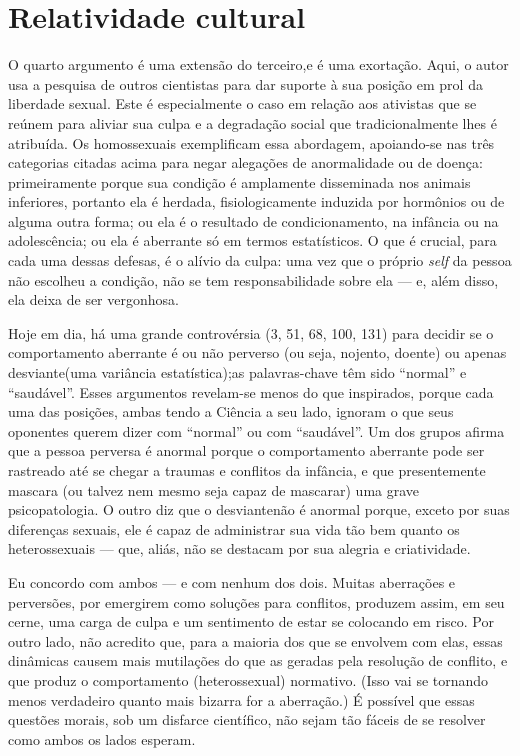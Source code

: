 \section{Relatividade cultural}

O quarto argumento é uma extensão do terceiro,\idxrela[|(] e é uma exortação.
Aqui, o autor usa a pesquisa de outros cientistas para dar suporte à
sua posição em prol da liberdade sexual. Este é especialmente o caso em
relação aos ativistas que se reúnem para aliviar sua culpa\idxculpa{} e a
degradação social que tradicionalmente lhes é atribuída. Os
homossexuais\idxhomosargu{} exemplificam essa abordagem, apoiando-se nas três
categorias citadas acima para negar alegações de anormalidade ou de
doença: primeiramente porque sua condição é amplamente disseminada nos
animais inferiores, portanto ela é herdada, fisiologicamente induzida
por hormônios ou de alguma outra forma; ou ela é o resultado de
condicionamento, na infância ou na adolescência; ou ela é aberrante só
em termos estatísticos. O que é crucial, para cada uma dessas defesas,
é o alívio da culpa:\idxculpa{} uma vez que o próprio \textit{self} da pessoa não
escolheu a condição, não se tem responsabilidade sobre ela --- e, além
disso, ela deixa de ser vergonhosa.

 Hoje em dia, há uma grande controvérsia (3, 51, 68, 100, 131) para
decidir se o comportamento aberrante é ou não perverso (ou seja,
nojento, doente) ou apenas\idxpervdesvi{} desviante\idxdesv[|(] (uma variância estatística);\idxaberrestat[|)] as palavras-chave têm sido ``normal'' e ``saudável''. Esses argumentos revelam-se menos do que inspirados, porque cada uma das posições, ambas tendo a Ciência a seu lado, ignoram o que seus oponentes querem dizer com ``normal'' ou com ``saudável''. Um dos grupos afirma que a pessoa perversa é anormal porque o comportamento aberrante pode ser \mbox{rastreado} até se chegar a traumas e conflitos da infância, e que presentemente mascara (ou talvez nem mesmo seja capaz de mascarar) uma grave psicopatologia. O outro diz que o desviante\idxdesv[|)] não é anormal porque, exceto por suas diferenças sexuais, ele é capaz de administrar sua vida tão bem quanto os heterossexuais --- que, aliás, não se destacam por sua alegria e criatividade.

 Eu concordo com ambos --- e com nenhum dos dois. Muitas aberrações e
perversões, por emergirem como soluções para conflitos, produzem assim,
em seu cerne, uma carga de culpa\idxculpa{} e um sentimento de estar se colocando
em risco. Por outro lado, não acredito que, para a maioria dos que se
envolvem com elas, essas dinâmicas causem mais mutilações do que as
geradas pela resolução de conflito, e que produz o comportamento
(heterossexual) normativo. (Isso vai se tornando menos verdadeiro
quanto mais bizarra for a aberração.) É possível que essas questões
morais, sob um disfarce científico, não sejam tão fáceis de se
resolver como ambos os lados esperam.

